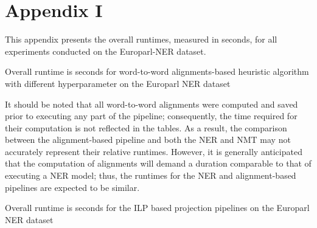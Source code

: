 \chapter{Appendix I}
\label{sec:appendix}

This appendix presents the overall runtimes, measured in seconds, for all experiments conducted on the Europarl-NER dataset.

\begin{table}[ht]
  \centering
  
  \caption{Overall runtime is seconds for word-to-word alignments-based heuristic
  algorithm with different hyperparameter  on the Europarl NER dataset}
  \label{tab:europarl_heur_runtime}
\end{table}

It should be noted that all word-to-word alignments were computed
and saved prior to executing any part of the pipeline; consequently,
the time required for their computation is not reflected in the
tables. As a result, the comparison between the alignment-based pipeline
and both the NER and NMT may not accurately represent their
relative runtimes. However, it is generally anticipated that
the computation of alignments will demand a duration comparable
to that of executing a NER model; thus, the runtimes for the
NER and alignment-based pipelines are expected to be similar.

\begin{table}[t]
  \centering
  
  \caption{Overall runtime is seconds for the ILP based projection pipelines
  on the Europarl NER dataset}
  \label{tab:europarl_ilp_runtime}
\end{table}
